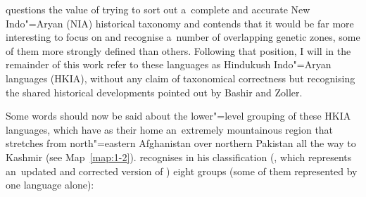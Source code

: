 \citet[460]{masica1991} questions the value of trying to sort out a~complete and accurate New Indo"=Aryan (NIA) historical taxonomy and contends that it would be far more interesting to focus on and recognise a~number of overlapping genetic zones, some of them more strongly defined than others. Following that position, I will in the remainder of this work refer to these languages as Hindukush Indo"=Aryan languages (HKIA), without any claim of taxonomical correctness but recognising the shared historical developments pointed out by Bashir and Zoller. 


Some words should now be said about the lower"=level grouping of these HKIA languages, which have as their home an~extremely mountainous region that stretches from north"=eastern Afghanistan over northern Pakistan all the way to Kashmir (see Map~\ref{map:1-2}). \citeauthor{strand2001} recognises in his classification (\citeyear[258]{strand2001}, which represents an~updated and corrected version of \citealt{strand1973}) eight groups (some of them represented by one language alone): 

